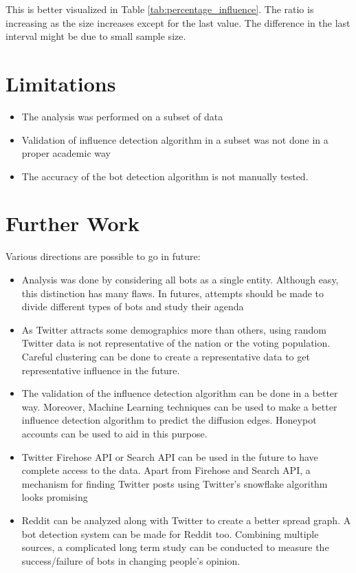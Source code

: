 \documentclass[letterpaper]{article}
\begin{document}
This is better visualized in Table \ref{tab:percentage_influence}. The ratio is increasing as the size increases except for the last value. The difference in the last interval
might be due to small sample size.

\section{Limitations}
\begin{itemize}
    \item The analysis was performed on a subset of data
    \item Validation of influence detection algorithm in a subset was not done in a proper academic way
    \item The accuracy of the bot detection algorithm is not manually tested.
\end{itemize}

\section{Further Work}
Various directions are possible to go in future:

\begin{itemize}
    \item Analysis was done by considering all bots as a single entity. Although easy, this distinction has many flaws. In futures, attempts should be made to divide different types of bots and study their agenda
    \item As Twitter attracts some demographics more than others, using random Twitter data is not representative of the nation or the voting population. Careful clustering can be done to create a representative data to get representative influence in the future.
    \item The validation of the influence detection algorithm can be done in a better way. Moreover, Machine Learning techniques can be used to make a better influence detection algorithm to predict the diffusion edges.
    Honeypot accounts can be used to aid in this purpose.
    \item Twitter Firehose API or Search API can be used in the future to have complete access to the data. Apart from Firehose and Search API, 
    a mechanism for finding Twitter posts using Twitter's snowflake algorithm looks promising \cite{bettermetrics2019}
    \item Reddit can be analyzed along with Twitter to create a better spread graph. A bot detection system can be made for Reddit too. Combining multiple sources, a complicated long term study can be conducted to measure the success/failure of bots in changing people's opinion.
\end{itemize}

\newpage



\end{document}
